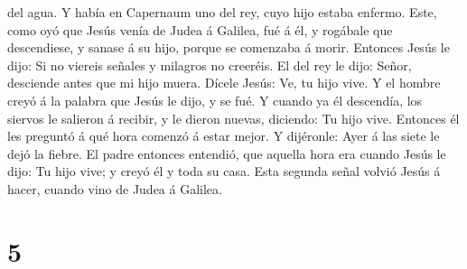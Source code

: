 del agua. Y había en Capernaum uno del rey, cuyo hijo estaba enfermo.
 Este, como oyó que Jesús venía de Judea á Galilea, fué á
él, y rogábale que descendiese, y sanase á su hijo, porque se comenzaba
á morir.  Entonces Jesús le dijo: Si no viereis señales y
milagros no creeréis.  El del rey le dijo: Señor,
desciende antes que mi hijo muera.  Dícele Jesús: Ve, tu
hijo vive. Y el hombre creyó á la palabra que Jesús le dijo, y se fué.
 Y cuando ya él descendía, los siervos le salieron á
recibir, y le dieron nuevas, diciendo: Tu hijo vive. 
Entonces él les preguntó á qué hora comenzó á estar mejor. Y dijéronle:
Ayer á las siete le dejó la fiebre.  El padre entonces
entendió, que aquella hora era cuando Jesús le dijo: Tu hijo vive; y
creyó él y toda su casa.  Esta segunda señal volvió Jesús
á hacer, cuando vino de Judea á Galilea.

\hypertarget{section-4}{%
\section{5}\label{section-4}}

